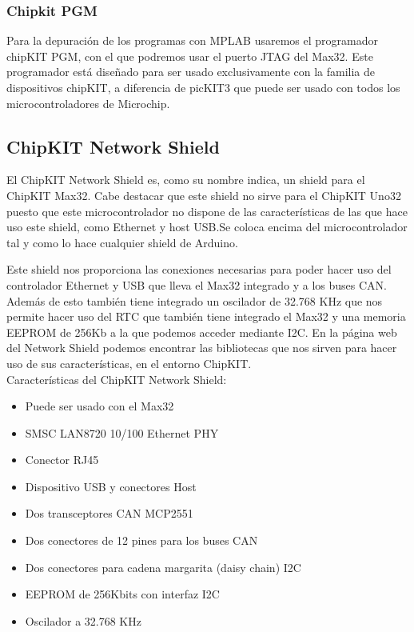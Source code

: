 \subsubsection{Chipkit PGM}
Para la depuración de los programas con MPLAB usaremos el programador chipKIT PGM\cite{website:pgm}, con el que podremos usar el puerto JTAG del Max32. Este programador está diseñado para ser usado exclusivamente con la familia de dispositivos chipKIT, a diferencia de picKIT3\cite{website:pickit} que puede ser usado con todos los microcontroladores de Microchip.



\subsection{ChipKIT Network Shield}

El ChipKIT Network Shield es, como su nombre indica, un shield para el ChipKIT Max32. Cabe destacar que este shield no sirve para el ChipKIT Uno32 puesto que este microcontrolador no dispone de las características de las que hace uso este shield, como Ethernet y host USB.Se coloca encima del microcontrolador tal y como lo hace cualquier shield de Arduino.


Este shield nos proporciona las conexiones necesarias para poder hacer uso del controlador Ethernet y USB que lleva el Max32 integrado y a los buses CAN. Además de esto también tiene integrado un oscilador de 32.768 KHz que nos permite hacer uso del RTC que también tiene integrado el Max32 y una memoria EEPROM de 256Kb a la que podemos acceder mediante I2C. En la página web del Network Shield\cite{website:network_shield} podemos encontrar las bibliotecas que nos sirven para hacer uso de sus características, en el entorno ChipKIT.\\

Características del ChipKIT Network Shield:
\begin{itemize}
	\item Puede ser usado con el Max32
	\item SMSC LAN8720 10/100 Ethernet PHY
	\item Conector RJ45
	\item Dispositivo USB y conectores Host
	\item Dos transceptores CAN MCP2551
	\item Dos conectores de 12 pines para los buses CAN
	\item Dos conectores para cadena margarita (daisy chain) I2C
	\item EEPROM de 256Kbits con interfaz I2C
	\item Oscilador a 32.768 KHz
\end{itemize}

